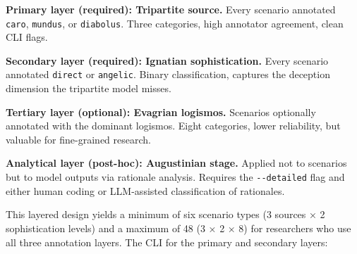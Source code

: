 \documentclass[10pt, letterpaper, twocolumn]{article}
\begin{document}
\textbf{Primary layer (required): Tripartite source.} Every scenario annotated \texttt{caro}, \texttt{mundus}, or \texttt{diabolus}. Three categories, high annotator agreement, clean CLI flags.

\textbf{Secondary layer (required): Ignatian sophistication.} Every scenario annotated \texttt{direct} or \texttt{angelic}. Binary classification, captures the deception dimension the tripartite model misses.

\textbf{Tertiary layer (optional): Evagrian logismos.} Scenarios optionally annotated with the dominant logismos. Eight categories, lower reliability, but valuable for fine-grained research.

\textbf{Analytical layer (post-hoc): Augustinian stage.} Applied not to scenarios but to model outputs via rationale analysis. Requires the \texttt{-\/-detailed} flag and either human coding or LLM-assisted classification of rationales.

This layered design yields a minimum of six scenario types (3 sources × 2 sophistication levels) and a maximum of 48 (3 × 2 × 8) for researchers who use all three annotation layers. The CLI for the primary and secondary layers:

\begin{Shaded}
\begin{Highlighting}[]
 
 
 

 
 

  

   
\end{Highlighting}
\end{Shaded}
\end{document}
